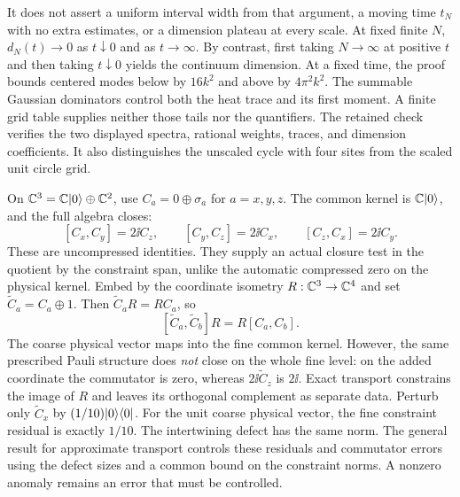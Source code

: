 It does not assert a uniform interval width from that argument, a moving time $t_N$ with no extra estimates, or a dimension plateau at every scale. At fixed finite $N$, $d_N(t)\to0$ as $t\downarrow0$ and as $t\to\infty$. By contrast, first taking $N\to\infty$ at positive $t$ and then taking $t\downarrow0$ yields the continuum dimension.
At a fixed time, the proof bounds centered modes below by $16k^2$ and above by $4\pi^2k^2$. The summable Gaussian dominators control both the heat trace and its first moment. A finite grid table supplies neither those tails nor the quantifiers. The retained check verifies the two displayed spectra, rational weights, traces, and dimension coefficients. It also distinguishes the unscaled cycle with four sites from the scaled unit circle grid.

On $\CC^3=\CC\ket0\oplus\CC^2$, use $C_a=0\oplus\sigma_a$ for $a=x,y,z$. The common kernel is $\CC\ket0$, and the full algebra closes:
\[
[C_x,C_y]=2\ii C_z,\qquad[C_y,C_z]=2\ii C_x,\qquad[C_z,C_x]=2\ii C_y.
\]
These are uncompressed identities. They supply an actual closure test in the quotient by the constraint span, unlike the automatic compressed zero on the physical kernel.
Embed by the coordinate isometry $R:\CC^3\to\CC^4$ and set $\widetilde C_a=C_a\oplus1$. Then $\widetilde C_aR=RC_a$, so
\[
[\widetilde C_a,\widetilde C_b]R=R[C_a,C_b].
\]
The coarse physical vector maps into the fine common kernel. However, the same prescribed Pauli structure does \emph{not} close on the whole fine level: on the added coordinate the commutator is zero, whereas $2\ii\widetilde C_z$ is $2\ii$. Exact transport constrains the image of $R$ and leaves its orthogonal complement as separate data.
Perturb only $\widetilde C_x$ by $(1/10)\lvert 0\rangle\langle 0\rvert$. For the unit coarse physical vector, the fine constraint residual is exactly $1/10$. The intertwining defect has the same norm. The general result for approximate transport controls these residuals and commutator errors using the defect sizes and a common bound on the constraint norms. A nonzero anomaly remains an error that must be controlled.

